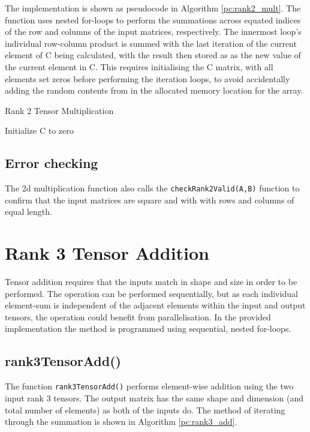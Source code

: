 \documentclass[10 pt, conference]{cssconf}
\begin{document}
The implementation is shown as pseudocode in Algorithm \ref{pc:rank2_mult}. The function uses nested for-loops to perform the summations across equated indices of the row and columns of the input matrices, respectively. The innermost loop's individual row-column product is summed with the last iteration of the current element of C being calculated, with the result then stored as as the new value of the current element in C. This requires initialising the C matrix, with all elements set zeros before performing the iteration loops, to avoid accidentally adding the random contents from in the allocated memory location for the array.

\begin{algorithm}[ht] \small
\caption{Rank 2 Tensor Multiplication}\label{pc:rank2_mult}
    	 \SetAlgoLined
	Initialize C to zero\;
\end{algorithm}%

\subsection{Error checking}
The 2d multiplication function also calls the \verb|checkRank2Valid(A,B)| function to confirm that the input matrices are square and with with rows and columns of equal length.

\section{Rank 3 Tensor Addition}
Tensor addition requires that the inputs match in shape and size in order to be performed. The operation can be performed sequentially, but as each individual element-sum is independent of the adjacent elements within the input and output tensors, the operation could benefit from parallelisation. In the provided implementation the method is programmed using sequential, nested for-loops.

\subsection{rank3TensorAdd()}
The function \verb|rank3TensorAdd()| performs element-wise addition using the two input rank 3 tensors. The output matrix has the same shape and dimension (and total number of elements) as both of the inputs do. The method of iterating through the summation is shown in Algorithm \ref{pc:rank3_add}.
\end{document}
